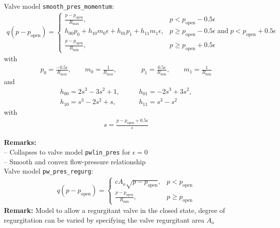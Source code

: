 \documentclass[a4paper,12pt]{report}
\begin{document}
Valve model \verb"smooth_pres_momentum":
\begin{equation}
\begin{aligned}
q(p-p_{\mathrm{open}}) = \begin{cases}\frac{p-p_{\mathrm{open}}}{R_{\max}}, & p < p_{\mathrm{open}}-0.5\epsilon \\ h_{00}p_{0} + h_{10}m_{0}\epsilon + h_{01}p_{1} + h_{11}m_{1}\epsilon, & p \geq p_{\mathrm{open}}-0.5\epsilon \;\text{and}\; p < p_{\mathrm{open}}+0.5\epsilon \\ \frac{p-p_{\mathrm{open}}}{R_{\min}}, & p \geq p_{\mathrm{open}}+0.5\epsilon  \end{cases}
\end{aligned}
\end{equation}
with
\begin{equation}
\begin{aligned}
p_{0}=\frac{-0.5\epsilon}{R_{\max}}, \qquad m_{0}=\frac{1}{R_{\max}}, \qquad && p_{1}=\frac{0.5\epsilon}{R_{\min}}, \qquad m_{1}=\frac{1}{R_{\min}} 
\end{aligned}
\end{equation}
and
\begin{equation}
\begin{aligned}
h_{00}=2s^3 - 3s^2 + 1, &\qquad h_{01}=-2s^3 + 3s^2, \\
h_{10}=s^3 - 2s^2 + s, &\qquad h_{11}=s^3 - s^2 
\end{aligned}
\end{equation}
with
\begin{equation}
\begin{aligned}
s=\frac{p-p_{\mathrm{open}}+0.5\epsilon}{\epsilon} 
\end{aligned}
\end{equation}

\textbf{Remarks:}\\
-- Collapses to valve model \verb"pwlin_pres" for $\epsilon=0$\\
-- Smooth and convex flow-pressure relationship\\

Valve model \verb"pw_pres_regurg":
\begin{equation}
\begin{aligned}
q(p-p_{\mathrm{open}}) = \begin{cases} c A_{\mathrm{o}} \sqrt{p-p_{\mathrm{open}}}, & p < p_{\mathrm{open}} \\ \frac{p-p_{\mathrm{open}}}{R_{\min}}, & p \geq p_{\mathrm{open}}  \end{cases}
\end{aligned}
\end{equation}
\textbf{Remark:} Model to allow a regurgitant valve in the closed state, degree of regurgitation can be varied by specifying the valve regurgitant area $A_{\mathrm{o}}$
\end{document}
